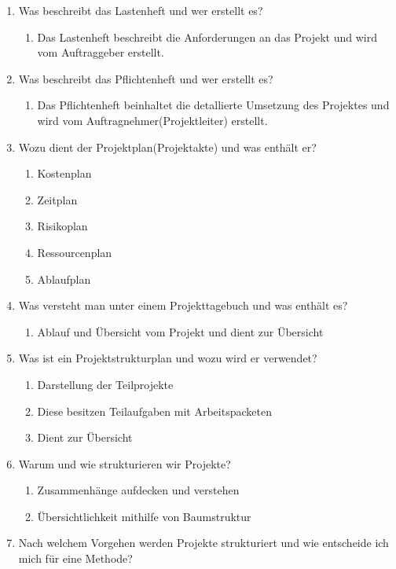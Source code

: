 \documentclass[12pt,a4paper]{article}
\begin{document}
\begin{enumerate}
\begin{enumerate}
	\end{enumerate}
	\item Was beschreibt das Lastenheft und wer erstellt es?
	\begin{enumerate}
		\item Das Lastenheft beschreibt die Anforderungen an das Projekt und wird vom Auftraggeber erstellt.
	\end{enumerate}
	\item Was beschreibt das Pflichtenheft und wer erstellt es?
	\begin{enumerate}
		\item Das Pflichtenheft beinhaltet die detallierte Umsetzung des Projektes und wird vom Auftragnehmer(Projektleiter) erstellt.
	\end{enumerate}
	\item Wozu dient der Projektplan(Projektakte) und was enthält er?
	\begin{enumerate}
		\item Kostenplan
		\item Zeitplan
		\item Risikoplan
		\item Ressourcenplan
		\item Ablaufplan
	\end{enumerate}
	\item Was versteht man unter einem Projekttagebuch und was enthält es?
	\begin{enumerate}
		\item Ablauf und Übersicht vom Projekt und dient zur Übersicht
	\end{enumerate}
	\item Was ist ein Projektstrukturplan und wozu wird er verwendet?
	\begin{enumerate}
		\item Darstellung der Teilprojekte
		\item Diese besitzen Teilaufgaben mit Arbeitspacketen
		\item Dient zur Übersicht
	\end{enumerate}
	\item Warum und wie strukturieren wir Projekte?
	\begin{enumerate}
		\item Zusammenhänge aufdecken und verstehen
		\item Übersichtlichkeit mithilfe von Baumstruktur
	\end{enumerate}
	\item Nach welchem Vorgehen werden Projekte strukturiert und wie entscheide ich mich für eine Methode?

\end{enumerate}
\end{document}
